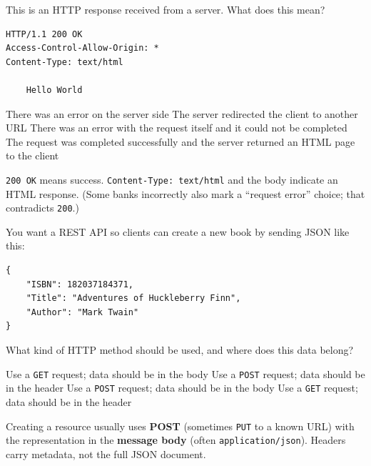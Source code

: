 \question[4]
This is an HTTP response received from a server. What does this mean?
\begin{lstlisting}[style=http]
HTTP/1.1 200 OK
Access-Control-Allow-Origin: *
Content-Type: text/html

    Hello World
\end{lstlisting}
\begin{choices}
  \choice There was an error on the server side
  \choice The server redirected the client to another URL
  \choice There was an error with the request itself and it could not be completed
  \CorrectChoice The request was completed successfully and the server returned an HTML page to the client
\end{choices}
\begin{solution}
  \texttt{200 OK} means success. \texttt{Content-Type: text/html} and the body indicate an HTML response. (Some banks incorrectly also mark a ``request error'' choice; that contradicts \texttt{200}.)
\end{solution}


\newpage

\question[4]
You want a REST API so clients can create a new book by sending JSON like this:
\begin{lstlisting}[style=javaexam]
{
    "ISBN": 182037184371,
    "Title": "Adventures of Huckleberry Finn",
    "Author": "Mark Twain"
}
\end{lstlisting}
What kind of HTTP method should be used, and where does this data belong?
\begin{choices}
  \choice Use a \texttt{GET} request; data should be in the body
  \choice Use a \texttt{POST} request; data should be in the header
  \CorrectChoice Use a \texttt{POST} request; data should be in the body
  \choice Use a \texttt{GET} request; data should be in the header
\end{choices}
\begin{solution}
  Creating a resource usually uses \textbf{POST} (sometimes \texttt{PUT} to a known URL) with the representation in the \textbf{message body} (often \texttt{application/json}). Headers carry metadata, not the full JSON document.
\end{solution}

